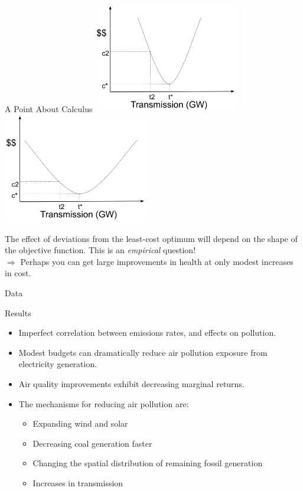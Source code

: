 \documentclass{beamer}
\begin{document}
\begin{frame}{A Point About Calculus}
    \includegraphics[width=0.48\textwidth]{Figures/Slide Pictures/Transmission1.png} \includegraphics[width=0.48\textwidth]{Figures/Slide Pictures/Transmission2.png}

    The effect of deviations from the least-cost optimum will depend on the shape of the objective function.  This is an \textit{empirical} question!\\
    \vspace{.5cm}
    $\Rightarrow$ Perhaps you can get large improvements in health at only modest increases in cost.
\end{frame}


\begin{frame}{Data}
    
\end{frame}

\begin{frame}{Results}
    \begin{itemize}
        \item Imperfect correlation between emissions rates, and effects on pollution.
        \item Modest budgets can dramatically reduce air pollution exposure from electricity generation.
        \item Air quality improvements exhibit decreasing marginal returns.
        \item The mechanisms for reducing air pollution are:
        \begin{itemize}
            \item Expanding wind and solar
            \item Decreasing coal generation faster
            \item Changing the spatial distribution of remaining fossil generation
            \item Increases in transmission
        \end{itemize}
    \end{itemize}
\end{frame}
\end{document}
